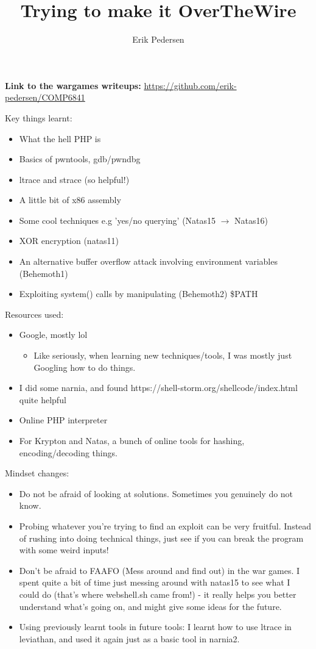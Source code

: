 \documentclass{article}
\title{Trying to make it OverTheWire}
\author{Erik Pedersen}
\begin{document}
\maketitle

\textbf{Link to the wargames writeups:}
\url{https://github.com/erik-pedersen/COMP6841}

Key things learnt:
\begin{itemize}
	\item What the hell PHP is
	\item Basics of pwntools, gdb/pwndbg
	\item ltrace and strace (so helpful!)
	\item A little bit of x86 assembly
	\item Some cool techniques e.g 'yes/no querying' (Natas15 $\to$ Natas16)
	\item XOR encryption (natas11)
	\item An alternative buffer overflow attack involving environment variables (Behemoth1)
	\item Exploiting system() calls by manipulating (Behemoth2) \$PATH
\end{itemize}

Resources used:

\begin{itemize}
	\item Google, mostly lol
		\begin{itemize}
			\item Like seriously, when learning new techniques/tools, I was mostly just Googling how to do things.
		\end{itemize}
	\item I did some narnia, and found https://shell-storm.org/shellcode/index.html quite helpful
	\item Online PHP interpreter
	\item For Krypton and Natas, a bunch of online tools for hashing, encoding/decoding things.

\end{itemize}

Mindset changes:

\begin{itemize}

	\item Do not be afraid of looking at solutions. Sometimes you genuinely do not know.
	\item Probing whatever you're trying to find an exploit can be very fruitful. Instead of rushing into doing technical things, just see if you can break the program with some weird inputs!
	\item Don't be afraid to FAAFO (Mess around and find out) in the war games. I spent quite a bit of time just messing around with natas15 to see what I could do (that's where webshell.sh came from!) - it really helps you better understand what's going on, and might give some ideas for the future.
	\item Using previously learnt tools in future tools: I learnt how to use ltrace in leviathan, and used it again just as a basic tool in narnia2.

\end{itemize}
\end{document}
